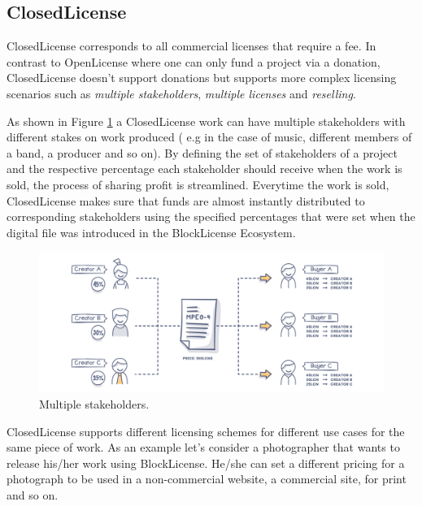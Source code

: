 
\subsection{ClosedLicense}

ClosedLicense corresponds to all commercial licenses that require a fee. In contrast to OpenLicense where one can only fund a project via a donation, ClosedLicense doesn't support donations but supports more complex licensing scenarios such as \textit{multiple stakeholders}, \textit{multiple licenses} and \textit{reselling}.

As shown in Figure \ref{fig:stakeholders} a ClosedLicense work can have multiple stakeholders with different stakes on work produced ( e.g in the case of music, different members of a band, a producer and so on). By defining the set of stakeholders of a project and the respective percentage each stakeholder should receive when the work is sold, the process of sharing profit is streamlined. Everytime the work is sold, ClosedLicense makes sure that funds are almost instantly distributed to corresponding stakeholders using the specified percentages that were set when the digital file was introduced in the BlockLicense Ecosystem.

\begin{figure}[h]
\centering
\begin{minipage}{1\textwidth}
  \centering
  \includegraphics[width=1\linewidth]{./figures/fig5.png}
  \caption{Multiple stakeholders.}
  \label{fig:stakeholders}
\end{minipage}
\end{figure}

ClosedLicense supports different licensing schemes for different use cases for the same piece of work. As an example let's consider a photographer that wants to release his/her work using BlockLicense. He/she can set a different pricing for a photograph to be used in a non-commercial website, a commercial site, for print and so on.

